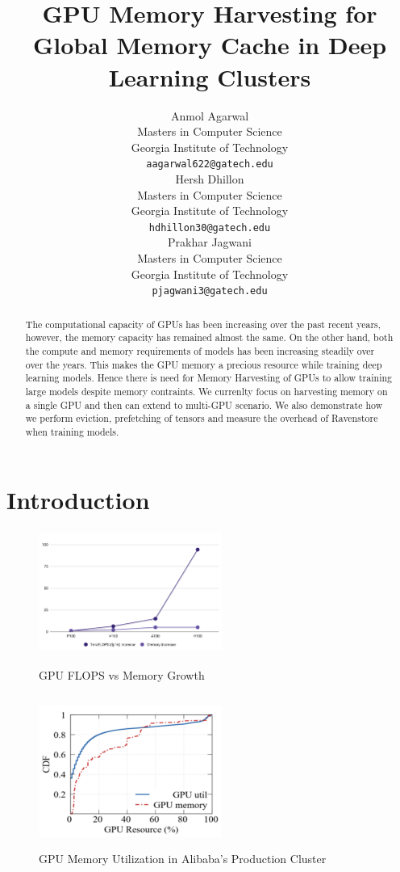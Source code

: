 \documentclass{article}
\title{GPU Memory Harvesting for Global Memory Cache in Deep Learning Clusters}
\author{Anmol Agarwal \\
	Masters in Computer Science\\
	Georgia Institute of Technology\\
	\texttt{aagarwal622@gatech.edu} \\
	\And
	Hersh Dhillon \\
	Masters in Computer Science\\
	Georgia Institute of Technology\\
	\texttt{hdhillon30@gatech.edu} \\
	\And
	Prakhar Jagwani \\
	Masters in Computer Science\\
	Georgia Institute of Technology\\
	\texttt{pjagwani3@gatech.edu} \\
}
\begin{document}
\maketitle

\begin{abstract}
The computational capacity of GPUs has been increasing over the past recent years, however, the memory capacity
has remained almost the same. On the other hand, both the compute and memory requirements of
models has been increasing steadily over over the years. This makes the GPU memory a 
precious resource while training deep learning models. Hence there is need for 
Memory Harvesting of GPUs to allow training large models despite memory contraints. We
currenlty focus on harvesting memory on a single GPU and then can extend to multi-GPU scenario.
We also demonstrate how we perform eviction, prefetching of tensors and measure the overhead
of Ravenstore when training models.
\end{abstract}




\section{Introduction}

\begin{figure}[!htbp]
	\begin{minipage}{0.48\textwidth}
	  \centering
	  	\includegraphics[height=4cm, width=6cm]{figures/teraflops.png}
		\caption{GPU FLOPS vs Memory Growth}
		\label{fig1}
	\end{minipage}\hfill
	\begin{minipage}{0.48\textwidth}
	  \centering
	  \includegraphics[height=5cm, width=6cm]{figures/AlibabaUtil.png}
		\caption{GPU Memory Utilization in Alibaba's Production Cluster}
		\label{fig2}
	\end{minipage}
\end{figure}
\end{document}
